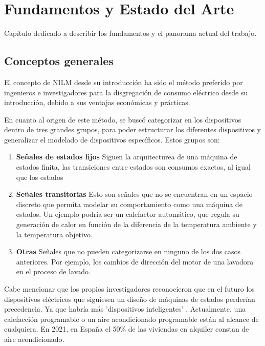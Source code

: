 \chapter{Fundamentos y Estado del Arte}
\label{ch:fundamentos}
Capítulo dedicado a describir los fundamentos y el panorama actual del trabajo. 

\section{Conceptos generales}
\label{se:ConceptosGeneralesa}

El concepto de NILM desde su introducción ha sido el método preferido por ingenieros e investigadores para la disgregación de consumo eléctrico desde su introducción, debido a sus ventajas económicas y prácticas.\autocite[pág. 2, pár. 4]{Nalmpantis2019}

En cuanto al origen de este método, se buscó categorizar en \autocite{192069} los dispositivos dentro de tres grandes grupos, para poder estructurar los diferentes dispositivos y generalizar el modelado de dispositivos específicos. 
Estos grupos son: 

\begin{enumerate}
\item \textbf{Señales de estados fijos} Siguen la arquitecturea de una máquina de estados finita, las transiciones entre estados son consumos exactos, al igual que los estados
\item \textbf{Señales transitorias} Esto son señales que no se encuentran en un espacio discreto que permita modelar su comportamiento como una máquina de estados. Un ejemplo podría ser un calefactor automático, que regula su generación de calor en función de la diferencia de la temperatura ambiente y la temperatura objetivo.
\item \textbf{Otras} Señales que no pueden categorizarse en ninguno de los dos casos anteriores. Por ejemplo, los cambios de dirección del motor de una lavadora en el proceso de lavado. 
\end{enumerate}

Cabe mencionar que los propios investigadores reconocieron que en el futuro los dispositivos eléctricos que siguiesen un diseño de máquinas de estados perderían precedencia. Ya que habría más 'dispositivos inteligentes' \autocite{192069}. Actualmente, una calefacción programable o un aire acondicionado programable están al alcance de cualquiera.
En 2021, en España el 50\% de las viviendas en alquiler constan de aire acondicionado\autocite{idealista2021}. 

